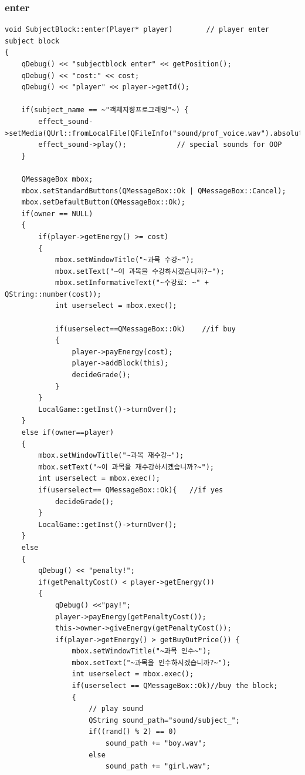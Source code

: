 \documentclass[10pt,oneside,a4paper,titlepage]{article}
\begin{document}
\subsubsection{enter}
\begin{lstlisting}[escapeinside=~~]
void SubjectBlock::enter(Player* player)        // player enter subject block
{
    qDebug() << "subjectblock enter" << getPosition();
    qDebug() << "cost:" << cost;
    qDebug() << "player" << player->getId();

    if(subject_name == ~"객체지향프로그래밍"~) {
        effect_sound->setMedia(QUrl::fromLocalFile(QFileInfo("sound/prof_voice.wav").absoluteFilePath()));
        effect_sound->play();            // special sounds for OOP
    }

    QMessageBox mbox;
    mbox.setStandardButtons(QMessageBox::Ok | QMessageBox::Cancel);
    mbox.setDefaultButton(QMessageBox::Ok);
    if(owner == NULL)  
    {
        if(player->getEnergy() >= cost)
        {
            mbox.setWindowTitle("~과목 수강~");
            mbox.setText("~이 과목을 수강하시겠습니까?~");
            mbox.setInformativeText("~수강료: ~" + QString::number(cost));
            int userselect = mbox.exec();

            if(userselect==QMessageBox::Ok)    //if buy
            {
                player->payEnergy(cost);
                player->addBlock(this);
                decideGrade();
            }
        }
        LocalGame::getInst()->turnOver();
    }
    else if(owner==player) 
    {
        mbox.setWindowTitle("~과목 재수강~");
        mbox.setText("~이 과목을 재수강하시겠습니까?~");
        int userselect = mbox.exec();
        if(userselect== QMessageBox::Ok){   //if yes
            decideGrade();
        }
        LocalGame::getInst()->turnOver();
    }
    else  
    {
        qDebug() << "penalty!";
        if(getPenaltyCost() < player->getEnergy())  
        {
            qDebug() <<"pay!";
            player->payEnergy(getPenaltyCost());
            this->owner->giveEnergy(getPenaltyCost());
            if(player->getEnergy() > getBuyOutPrice()) {
                mbox.setWindowTitle("~과목 인수~");
                mbox.setText("~과목을 인수하시겠습니까?~");
                int userselect = mbox.exec();
                if(userselect == QMessageBox::Ok)//buy the block;
                {
                    // play sound
                    QString sound_path="sound/subject_";
                    if((rand() % 2) == 0)
                        sound_path += "boy.wav";
                    else
                        sound_path += "girl.wav";


\end{lstlisting}
\end{document}
